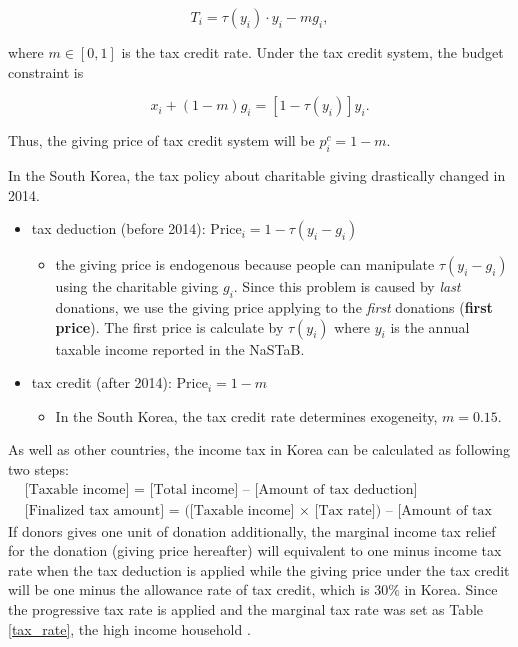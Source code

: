 \documentclass[ review  , 3p ]{elsarticle}
\providecommand{\tightlist}{%
  \setlength{\itemsep}{0pt}\setlength{\parskip}{0pt}}
\begin{document}
  \[
      T_i = \tau(y_i)\cdot y_i - m g_i,
  \]
  
  where \(m \in [0, 1]\) is the tax credit rate. Under the tax credit system, the budget constraint is
  
  \[
      x_i + (1 - m) g_i = [1 - \tau(y_i)] y_i.
  \]
  
  Thus, the giving price of tax credit system will be \(p_i^c = 1 - m\).
  
  In the South Korea, the tax policy about charitable giving drastically changed in 2014.
  
  \begin{itemize}
  \tightlist
  \item
    tax deduction (before 2014): \(\text{Price}_i = 1 - \tau(y_i - g_i)\)
  
    \begin{itemize}
    \tightlist
    \item
      the giving price is endogenous because people can manipulate \(\tau(y_i - g_i)\) using the charitable giving \(g_i\). Since this problem is caused by \emph{last} donations, we use the giving price applying to the \emph{first} donations (\textbf{first price}). The first price is calculate by \(\tau(y_i)\) where \(y_i\) is the annual taxable income reported in the NaSTaB.
    \end{itemize}
  \item
    tax credit (after 2014): \(\text{Price}_i = 1 - m\)
  
    \begin{itemize}
    \tightlist
    \item
      In the South Korea, the tax credit rate determines exogeneity, \(m = 0.15\).
    \end{itemize}
  \end{itemize}
  
  As well as other countries, the income tax in Korea can be calculated as following two steps:
  \begin{align}
  &\text{[Taxable income] = [Total income] – [Amount of tax deduction]}\\
  &\text{[Finalized tax amount] = ([Taxable income] × [Tax rate]) – [Amount of tax credit]}
  \end{align}
  If donors gives one unit of donation additionally, the marginal income tax relief for the donation (giving price hereafter) will equivalent to one minus income tax rate when the tax deduction is applied while the giving price under the tax credit will be one minus the allowance rate of tax credit, which is 30\% in Korea. Since the progressive tax rate is applied and the marginal tax rate was set as Table \ref{tax_rate}, the high income household .
  
\end{document}
